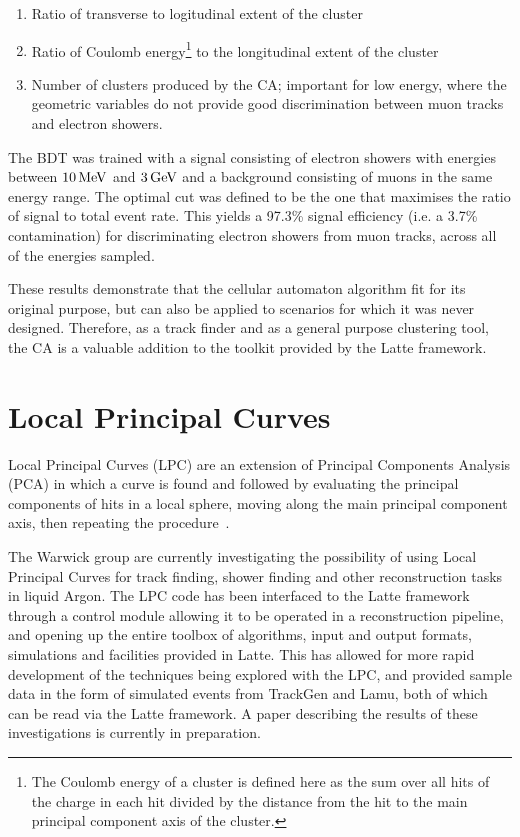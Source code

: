 \begin{enumerate}
    \item Ratio of transverse to logitudinal extent of the cluster
    \item Ratio of Coulomb energy\footnote{The Coulomb energy of a cluster is defined here as the sum over all hits of the charge in each hit divided by the distance from the hit to the main principal component axis of the cluster.} to the longitudinal extent of the cluster
    \item Number of clusters produced by the CA; important for low energy, where the geometric variables do not provide good discrimination between muon tracks and electron showers.
\end{enumerate}

The BDT was trained with a signal consisting of electron showers with energies between $10\,\mathrm{MeV}$ and $3\,\mathrm{GeV}$ and a background consisting of muons in the same energy range. The optimal cut was defined to be the one that maximises the ratio of signal to total event rate. This yields a 97.3\% signal efficiency (i.e. a 3.7\% contamination) for discriminating electron showers from muon tracks, across all of the energies sampled.

These results demonstrate that the cellular automaton algorithm fit for its original purpose, but can also be applied to scenarios for which it was never designed. Therefore, as a track finder and as a general purpose clustering tool, the CA is a valuable addition to the toolkit provided by the Latte framework.

\section{Local Principal Curves}
Local Principal Curves (LPC) are an extension of Principal Components Analysis (PCA) in which a curve is found and followed by evaluating the principal components of hits in a local sphere, moving along the main principal component axis, then repeating the procedure~\citep{Einbeck2005}.

The Warwick group are currently investigating the possibility of using Local Principal Curves for track finding, shower finding and other reconstruction tasks in liquid Argon. The LPC code has been interfaced to the Latte framework through a control module allowing it to be operated in a reconstruction pipeline, and opening up the entire toolbox of algorithms, input and output formats, simulations and facilities provided in Latte. This has allowed for more rapid development of the techniques being explored with the LPC, and provided sample data in the form of simulated events from TrackGen and Lamu, both of which can be read via the Latte framework. A paper describing the results of these investigations is currently in preparation.

